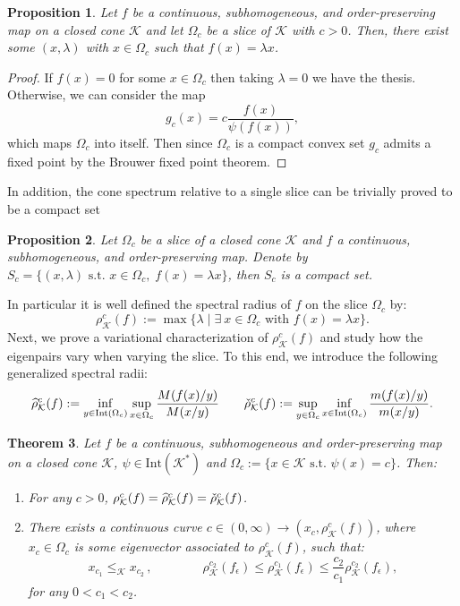 \documentclass{article}
\newtheorem{theorem}{Theorem}[section]
\newtheorem{proposition}[theorem]{Proposition}
\newcommand{\cradius}{\rho_{\cone}}
\newcommand{\cgradius}{\widehat{\rho}_{\cone}}
\newcommand{\cdradius}{\Check{\rho}_{\cone}}
\newcommand{\cone}{\mathcal{K}}
\newcommand{\interior}{\mathrm{Int}}
\newcommand{\cleq}{\leq_{\cone}}
\begin{document}
\begin{proposition}
    Let $f$ be a continuous, subhomogeneous, and order-preserving map on a closed cone $\cone$ and let $\Omega_c$ be a slice of $\cone$ with $c>0$. Then, there exist some $(x,\lambda)$ with $x\in \Omega_c$ such that $f(x)=\lambda x$.
\end{proposition}
\begin{proof}
    If $f(x)=0$ for some $x\in \Omega_c$ then taking $\lambda=0$ we have the thesis. Otherwise, we can consider the map
    \begin{equation}
        g_c(x)=c\frac{f(x)}{\psi(f(x))},
    \end{equation}
    which maps $\Omega_c$ into itself. Then since $\Omega_c$ is a compact convex set $g_c$ admits a fixed point by the Brouwer fixed point theorem. 
\end{proof}
%
In addition, the cone spectrum relative to a single slice can be trivially proved to be a compact set 
\begin{proposition}
    Let $\Omega_c$ be a slice of a closed cone $\cone$ and $f$ a continuous, subhomogeneous, and order-preserving map. Denote by $S_c=\{(x,\lambda) \text{ s.t. } x\in \Omega_c, \; f(x)=\lambda x \}$, then $S_c$ is a compact set.
\end{proposition}
%
%
%
In particular it is well defined the spectral radius of $f$ on the slice $\Omega_c$ by:
\begin{equation}
    \cradius^c(f):=\max\{\lambda\;|\; \exists\: x\in\Omega_c \text{ with } f(x)=\lambda x\}.
\end{equation}
%
%
Next, we prove a variational characterization of $\cradius^c(f)$ and study how the eigenpairs vary when varying the slice.
%
To this end, we introduce the following generalized spectral radii:
\begin{equation}
\cgradius^c(f):=\inf_{y\in \interior(\Omega_c)}\sup_{x\in \Omega_c}\frac{M(f(x)/y)}{M(x/y)}
%
\qquad
%
\cdradius^c(f):=\sup_{y\in\Omega_c}\inf_{x\in \interior(\Omega_c)}\frac{m(f(x)/y)}{m(x/y)}.
\end{equation}
%
%
\begin{theorem}\label{Prop_characterization_of_subhomog_spectral_radius}
Let $f$ be a continuous, subhomogeneous and order-preserving map on a closed cone $\cone$, $\psi\in \interior(\cone^*)$ and $\Omega_c:=\{x\in \cone \text{ s.t. } \psi(x)=c\}$. Then:
\begin{enumerate}
    \item For any $c>0$, $\cradius^c(f)=\cgradius^c(f)=\cdradius^c(f)$.
    \item There exists a continuous curve $c\in(0,\infty)\rightarrow (x_c,\cradius^c(f))$, where $x_c\in \Omega_c$ is some eigenvector associated to $\cradius^c(f)$, such that: 
    \begin{equation}
        x_{c_1}\cleq x_{c_2}\,,  \qquad\qquad \cradius^{c_2}(f_{\epsilon}) \leq \cradius^{c_1}(f_{\epsilon})\leq \frac{c_2}{c_1}\cradius^{c_2}(f_{\epsilon}),
    \end{equation}
    for any $0<c_1< c_2$.
\end{enumerate}
\end{theorem}
\end{document}
